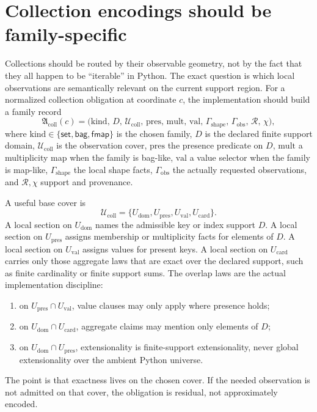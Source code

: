 \documentclass[11pt]{report}
\begin{document}
\section{Collection encodings should be family-specific}
Collections should be routed by their observable geometry, not by the fact that they all happen to be ``iterable'' in Python. The exact question is which local observations are semantically relevant on the current support region. For a normalized collection obligation at coordinate $c$, the implementation should build a family record
\[
\mathfrak{A}_{\mathrm{coll}}(c)
=
\bigl(
\mathrm{kind},\,
D,\,
\mathcal{U}_{\mathrm{coll}},\,
\mathrm{pres},\,
\mathrm{mult},\,
\mathrm{val},\,
\Gamma_{\mathrm{shape}},\,
\Gamma_{\mathrm{obs}},\,
\mathcal{R},\,
\chi
\bigr),
\]
where $\mathrm{kind}\in\{\mathsf{set},\mathsf{bag},\mathsf{fmap}\}$ is the chosen family, $D$ is the declared finite support domain, $\mathcal{U}_{\mathrm{coll}}$ is the observation cover, $\mathrm{pres}$ the presence predicate on $D$, $\mathrm{mult}$ a multiplicity map when the family is bag-like, $\mathrm{val}$ a value selector when the family is map-like, $\Gamma_{\mathrm{shape}}$ the local shape facts, $\Gamma_{\mathrm{obs}}$ the actually requested observations, and $\mathcal{R},\chi$ support and provenance.

A useful base cover is
\[
\mathcal{U}_{\mathrm{coll}}
=
\{U_{\mathrm{dom}},U_{\mathrm{pres}},U_{\mathrm{val}},U_{\mathrm{card}}\}.
\]
A local section on $U_{\mathrm{dom}}$ names the admissible key or index support $D$. A local section on $U_{\mathrm{pres}}$ assigns membership or multiplicity facts for elements of $D$. A local section on $U_{\mathrm{val}}$ assigns values for present keys. A local section on $U_{\mathrm{card}}$ carries only those aggregate laws that are exact over the declared support, such as finite cardinality or finite support sums. The overlap laws are the actual implementation discipline:
\begin{enumerate}
\item on $U_{\mathrm{pres}}\cap U_{\mathrm{val}}$, value clauses may only apply where presence holds;
\item on $U_{\mathrm{dom}}\cap U_{\mathrm{card}}$, aggregate claims may mention only elements of $D$;
\item on $U_{\mathrm{dom}}\cap U_{\mathrm{pres}}$, extensionality is finite-support extensionality, never global extensionality over the ambient Python universe.
\end{enumerate}
The point is that exactness lives on the chosen cover. If the needed observation is not admitted on that cover, the obligation is residual, not approximately encoded.
\end{document}
